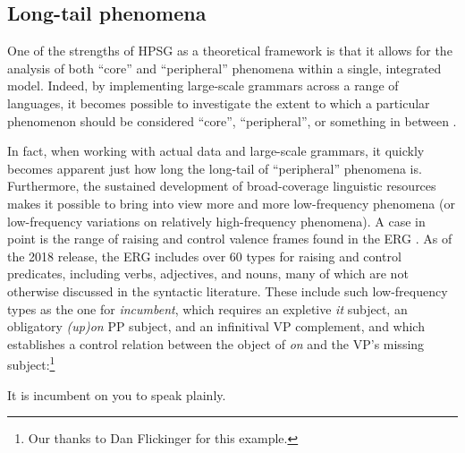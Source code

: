 \documentclass[output=paper,nonflat]{langsci/langscibook}
\begin{document}
\subsection{Long-tail phenomena} %
One of the strengths of HPSG as a theoretical framework is that it allows for
the analysis of both ``core'' and ``peripheral'' phenomena within a single, integrated model.
Indeed, by implementing large-scale grammars across a range of languages,
it becomes possible to investigate the extent to which
a particular phenomenon should be considered ``core'', ``peripheral'',
or something in between \citep{MuellerKernigkeit}.

In fact, when working with actual data and large-scale grammars,
it quickly becomes apparent just how long the long-tail of ``peripheral'' phenomena is. Furthermore, the sustained development of broad-coverage linguistic resources makes it possible
to bring into view more and more low-frequency phenomena
(or low-frequency variations on relatively high-frequency phenomena).
A case in point is the range of raising and control valence frames
found in the ERG \citep{Flickinger2000a,Flickinger2011a-u}.
As of the 2018 release, the ERG includes over 60 types for raising and control predicates,
including verbs, adjectives, and nouns,
many of which are not otherwise discussed in the syntactic literature.
These include such low-frequency types as the one for \textit{incumbent},
which requires an expletive \textit{it} subject,
an obligatory \textit{(up)on} PP subject,
and an infinitival VP complement,
and which establishes a control relation between
the object of \textit{on} and the VP's missing subject:\footnote{%
	Our thanks to Dan Flickinger for this example.
}

\begin{exe}
\ex\label{cl:incumbent} 
It is incumbent on you to speak plainly.
\end{exe}




\end{document}
